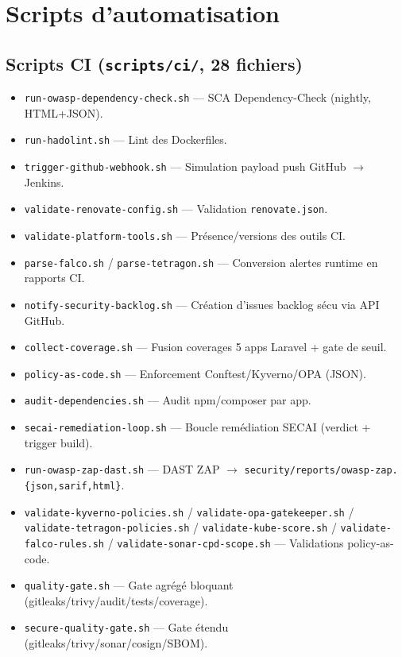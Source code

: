 \documentclass[12pt,a4paper,openany]{report}
\begin{document}
\section{Scripts d'automatisation}

\subsection{Scripts CI (\texttt{scripts/ci/}, 28 fichiers)}

\begin{itemize}
  \item \texttt{run-owasp-dependency-check.sh} — SCA Dependency-Check (nightly, HTML+JSON).
  \item \texttt{run-hadolint.sh} — Lint des Dockerfiles.
  \item \texttt{trigger-github-webhook.sh} — Simulation payload push GitHub $\rightarrow$ Jenkins.
  \item \texttt{validate-renovate-config.sh} — Validation \texttt{renovate.json}.
  \item \texttt{validate-platform-tools.sh} — Présence/versions des outils CI.
  \item \texttt{parse-falco.sh} / \texttt{parse-tetragon.sh} — Conversion alertes runtime en rapports CI.
  \item \texttt{notify-security-backlog.sh} — Création d'issues backlog sécu via API GitHub.
  \item \texttt{collect-coverage.sh} — Fusion coverages 5 apps Laravel + gate de seuil.
  \item \texttt{policy-as-code.sh} — Enforcement Conftest/Kyverno/OPA (JSON).
  \item \texttt{audit-dependencies.sh} — Audit npm/composer par app.
  \item \texttt{secai-remediation-loop.sh} — Boucle remédiation SECAI (verdict + trigger build).
  \item \texttt{run-owasp-zap-dast.sh} — DAST ZAP $\rightarrow$ \texttt{security/reports/owasp-zap.\{json,sarif,html\}}.
  \item \texttt{validate-kyverno-policies.sh} / \texttt{validate-opa-gatekeeper.sh} / \texttt{validate-tetragon-policies.sh} / \texttt{validate-kube-score.sh} / \texttt{validate-falco-rules.sh} / \texttt{validate-sonar-cpd-scope.sh} — Validations policy-as-code.
  \item \texttt{quality-gate.sh} — Gate agrégé bloquant (gitleaks/trivy/audit/tests/coverage).
  \item \texttt{secure-quality-gate.sh} — Gate étendu (gitleaks/trivy/sonar/cosign/SBOM).

\end{itemize}
\end{document}
